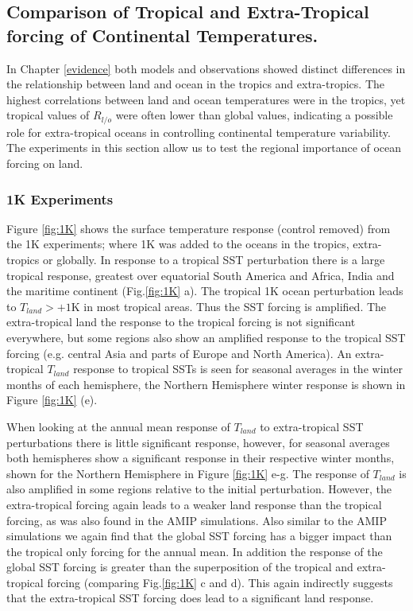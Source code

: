 \subsection{Comparison of Tropical and Extra-Tropical forcing of Continental 
Temperatures.}
In Chapter \ref{evidence} both models and observations showed distinct 
differences in the relationship between land and ocean in the tropics and 
extra-tropics. The highest correlations between land and ocean temperatures were 
in the tropics, yet tropical values of $R_{l/o}$ were often lower than global 
values, indicating a possible role for extra-tropical oceans in controlling 
continental temperature variability. The experiments in this section allow us to 
test the regional importance of ocean forcing on land.

\subsubsection{1K Experiments}

Figure \ref{fig:1K} shows the surface temperature response (control removed) 
from the 1K experiments; where 1K was added to the oceans in the tropics, 
extra-tropics or globally. In response to a tropical SST perturbation there is a 
large tropical response, greatest over equatorial South America and Africa, 
India and the maritime continent (Fig.\ref{fig:1K} a). The tropical 1K ocean 
perturbation leads to $T_{land}>+1$K in most tropical areas. Thus the SST 
forcing is amplified. The extra-tropical land the response to the tropical 
forcing is not significant everywhere, but some regions also show an amplified 
response to the tropical SST forcing (e.g. central Asia and parts of Europe and 
North America).  An extra-tropical $T_{land}$ response to tropical SSTs is seen 
for seasonal averages in the winter months of each hemisphere, the Northern 
Hemisphere winter response is shown in Figure \ref{fig:1K} (e).

When looking at the annual mean response of $T_{land}$ to extra-tropical SST 
perturbations there is little significant response, however, for seasonal 
averages both hemispheres show a significant response in their respective winter 
months, shown for the Northern Hemisphere in Figure \ref{fig:1K} e-g. The 
response of $T_{land}$ is also amplified in some regions relative to the initial 
perturbation.  However, the extra-tropical forcing again leads to a weaker land 
response than the tropical forcing, as was also found in the AMIP simulations.  
Also similar to the AMIP simulations we again find that the  global SST forcing 
has a bigger impact than the tropical only forcing for the annual mean. In 
addition the response of the global SST forcing is greater than the 
superposition of the tropical and extra-tropical forcing (comparing 
Fig.\ref{fig:1K} c and d).  This again indirectly suggests that the 
extra-tropical SST forcing does lead to a significant land response.

